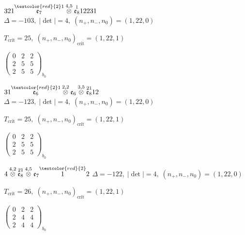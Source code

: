 \documentclass[10pt]{article}
\begin{document}
\smallskip

$321\overset{\textcolor{red}{2}1}{\mathfrak{e}_7}\overset{4,5}{\otimes}\overset{1}{\mathfrak{e}_8}12231$ \quad $\Delta=-103,\; |\det|=4,\; (n_+,n_-,n_0)=(1,22,0)$

\hspace{1em}$T_{\text{crit}}=25,\; (n_+,n_-,n_0)_{\text{crit}}=(1,22,1)$

\hspace{2em}$\left(\begin{smallmatrix}0 & 2 & 2 \\ 2 & 5 & 5 \\ 2 & 5 & 5\end{smallmatrix}\right)_{\!b_0}$

\smallskip

$31\overset{\textcolor{red}{2}1}{\mathfrak{e}_6}\overset{2,2}{\otimes}\mathfrak{e}_6\overset{3,5}{\otimes}\overset{21}{\mathfrak{e}_8}12$ \quad $\Delta=-123,\; |\det|=4,\; (n_+,n_-,n_0)=(1,22,0)$

\hspace{1em}$T_{\text{crit}}=25,\; (n_+,n_-,n_0)_{\text{crit}}=(1,22,1)$

\hspace{2em}$\left(\begin{smallmatrix}0 & 2 & 2 \\ 2 & 5 & 5 \\ 2 & 5 & 5\end{smallmatrix}\right)_{\!b_0}$

\smallskip

$4\overset{4,2}{\otimes}\overset{21}{\mathfrak{e}_8}\overset{4,5}{\otimes}\mathfrak{e}_7\overset{\textcolor{red}{2}}{1}2$ \quad $\Delta=-122,\; |\det|=4,\; (n_+,n_-,n_0)=(1,22,0)$

\hspace{1em}$T_{\text{crit}}=26,\; (n_+,n_-,n_0)_{\text{crit}}=(1,22,1)$

\hspace{2em}$\left(\begin{smallmatrix}0 & 2 & 2 \\ 2 & 4 & 4 \\ 2 & 4 & 4\end{smallmatrix}\right)_{\!b_0}$
\end{document}
